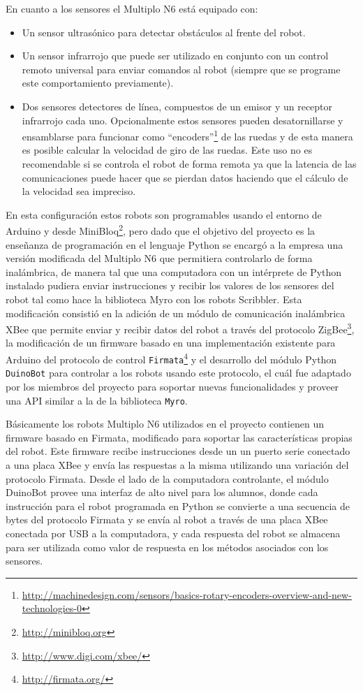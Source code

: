 En cuanto a los sensores el Multiplo N6 está equipado con:
\begin{itemize}
    \item Un sensor ultrasónico para detectar obstáculos al frente del
        robot.
    \item Un sensor infrarrojo que puede ser utilizado en conjunto con
        un control remoto universal para enviar comandos al robot
        (siempre que se programe este comportamiento previamente).
    \item Dos sensores detectores de línea, compuestos de un emisor y
        un receptor infrarrojo cada uno. Opcionalmente estos sensores
        pueden desatornillarse y ensamblarse
        para funcionar como
        ``encoders''\footnote{\url{http://machinedesign.com/sensors/basics-rotary-encoders-overview-and-new-technologies-0}}
        de las ruedas y de esta manera es posible
        calcular la velocidad de giro de las ruedas. Este uso
        no es recomendable si se controla el robot de forma remota
        ya que la latencia de las comunicaciones puede hacer que se pierdan
        datos haciendo que el cálculo de la velocidad sea impreciso.
\end{itemize}

En esta configuración estos robots son programables usando el entorno de
Arduino y desde MiniBloq\footnote{\url{http://minibloq.org}}, pero dado que el objetivo del proyecto es la enseñanza de
programación en el lenguaje Python se encargó a la empresa una versión
modificada del Multiplo N6 que permitiera controlarlo de forma inalámbrica,
de manera tal que una computadora con un intérprete de Python instalado
pudiera enviar instrucciones y recibir los valores de los sensores
del robot tal como hace la biblioteca Myro con los robots Scribbler.
Esta
modificación consistió en la adición de un módulo de comunicación inalámbrica
XBee
que permite enviar y recibir datos del robot a través del protocolo
ZigBee\footnote{\url{http://www.digi.com/xbee/}}, la modificación de
un firmware basado en una implementación existente para Arduino del protocolo
de control \texttt{Firmata}\footnote{\url{http://firmata.org/}} y el
desarrollo
del módulo Python \texttt{DuinoBot} para controlar a los robots usando
este protocolo, el
cuál fue adaptado por los miembros del proyecto \proyecto{}
para soportar nuevas funcionalidades y proveer una
API similar a la de la biblioteca
\texttt{Myro}\citep{lanfranco_2012}.

Básicamente los robots Multiplo N6 utilizados en el proyecto \proyecto{}
contienen un
firmware basado en Firmata, modificado para soportar
las características propias del robot. Este firmware recibe instrucciones desde
un un puerto serie conectado a una placa XBee y envía las respuestas
a la misma utilizando una variación del protocolo Firmata. Desde el lado
de la computadora controlante, el módulo DuinoBot provee una interfaz
de alto nivel para los alumnos, donde cada instrucción para el robot
programada
en Python se convierte a una secuencia de bytes del protocolo Firmata
y se envía al robot a través de una placa XBee conectada por USB a la
computadora, y cada respuesta del robot se almacena para ser utilizada
como valor de respuesta en los métodos asociados con los sensores.


